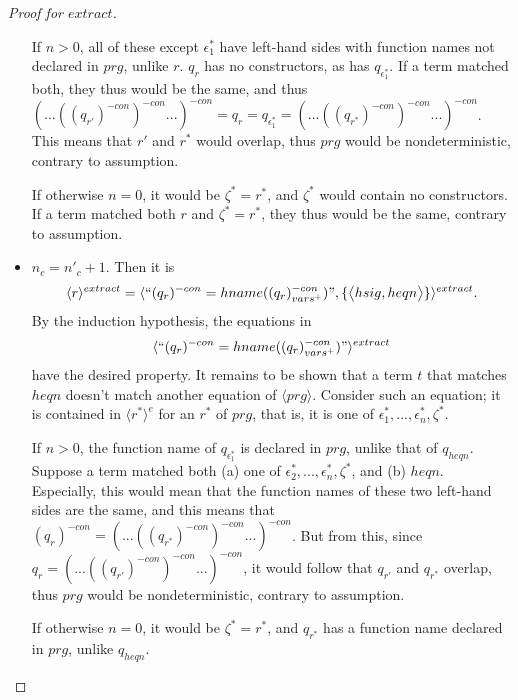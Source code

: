 \documentclass[11pt]{article} %
\begin{document}
\begin{proof}[Proof for $extract$]
\begin{itemize}
If $n > 0$, all of these except $\epsilon^*_1$ have left-hand sides with function names not declared in $prg$, unlike $r$. $q_r$ has no constructors, as has $q_{\epsilon^*_1}$. If a term matched both, they thus would be the same, and thus $(...((q_{r'})^{-con})^{-con}...)^{-con} = q_r = q_{\epsilon^*_1} = (...((q_{r^*})^{-con})^{-con}...)^{-con}$. This means that $r'$ and $r^*$ would overlap, thus $prg$ would be nondeterministic, contrary to assumption.

If otherwise $n = 0$, it would be $\zeta^* = r^*$, and $\zeta^*$ would contain no constructors. If a term matched both $r$ and $\zeta^* = r^*$, they thus would be the same, contrary to assumption.

\item $n_c = n'_c + 1$. Then it is
\begin{equation*}
\langle r \rangle^{extract} = \langle `` (q_r)^{-con} = hname((q_r)^{-con}_{vars^+}) ", \{\big\langle hsig, heqn \big\rangle\} \rangle^{extract}.
\end{equation*}
By the induction hypothesis, the equations in
\begin{equation*}
\langle `` (q_r)^{-con} = hname((q_r)^{-con}_{vars^+}) " \rangle^{extract}
\end{equation*}
have the desired property. It remains to be shown that a term $t$ that matches $heqn$ doesn't match another equation of $\langle prg \rangle$. Consider such an equation; it is contained in $\langle r^* \rangle^e$ for an $r^*$ of $prg$, that is, it is one of $\epsilon^*_1, ..., \epsilon^*_n, \zeta^*$.

If $n > 0$, the function name of $q_{\epsilon^*_1}$ is declared in $prg$, unlike that of $q_{heqn}$. Suppose a term matched both (a) one of $\epsilon^*_2, ..., \epsilon^*_n, \zeta^*$, and (b) $heqn$. Especially, this would mean that the function names of these two left-hand sides are the same, and this means that $(q_r)^{-con} = (...((q_{r^*})^{-con})^{-con}...)^{-con}$. But from this, since $q_r = (...((q_{r'})^{-con})^{-con}...)^{-con}$, it would follow that $q_{r'}$ and $q_{r^*}$ overlap, thus $prg$ would be nondeterministic, contrary to assumption.

If otherwise $n = 0$, it would be $\zeta^* = r^*$, and $q_{r^*}$ has a function name declared in $prg$, unlike $q_{heqn}$.

\end{itemize}

\end{proof}
\end{document}
